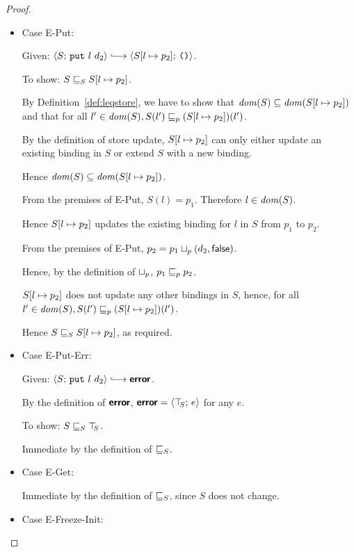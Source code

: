 \begin{proof}
\begin{itemize}
    \item Case {\sc E-Put}:

      Given: $\config{S}{\putexp{l}{d_2}} \parstepsto
      \config{\extSRaw{S}{l}{p_2}}{\unit}$.

      To show: $S \sqsubseteq_S S[l \mapsto p_2]$.

      By Definition~\ref{def:leqstore}, we have to show that $\mathit{dom}(S)
      \subseteq \mathit{dom}(S[l \mapsto p_2])$ and that for all $l' \in
      \mathit{dom}(S), \\
      S(l') \sqsubseteq_p (S[l \mapsto p_2])(l')$.

      By the definition of store update, $S[l \mapsto p_2]$ can only
      either update an existing binding in $S$ or extend $S$ with a
      new binding.

      Hence $\mathit{dom}(S) \subseteq \mathit{dom}(S[l \mapsto p_2])$.

      From the premises of {\sc E-Put}, $S(l) = p_1$.  Therefore $l
      \in \mathit{dom}(S)$.

      Hence $S[l \mapsto p_2]$ updates the existing binding for $l$
      in $S$ from $p_1$ to $p_2$.

      From the premises of {\sc E-Put}, $p_2 =
      p_1 \sqcup_p (d_2, \textsf{false})$.

      Hence, by the definition of $ \sqcup_p $, $p_1 \sqsubseteq_p p_2$.

      $S[l \mapsto p_2]$ does not update any other bindings in $S$,
      hence, for all $l' \in \mathit{dom}(S), S(l') \sqsubseteq_p
      (S[l \mapsto p_2])(l')$.

      Hence $S \sqsubseteq_S S[l \mapsto p_2]$, as required.

    \item Case {\sc E-Put-Err}:

      Given: $\config{S}{\putexp{l}{d_2}} \parstepsto \error$.

      By the definition of $\textbf{\textsf{error}}$, $\textbf{\textsf{error}} = \langle \top\hspace{-0.85mm}_{S};\, e \rangle$ for
      any $e$.

      To show: $S \sqsubseteq_S \top\hspace{-0.85mm}_{S}$.

      Immediate by the definition of $ \sqsubseteq_S $.

    \item Case {\sc E-Get}:

      Immediate by the definition of $ \sqsubseteq_S $, since $S$ does
      not change.

    \item Case {\sc E-Freeze-Init}:


\end{itemize}
\end{proof}
